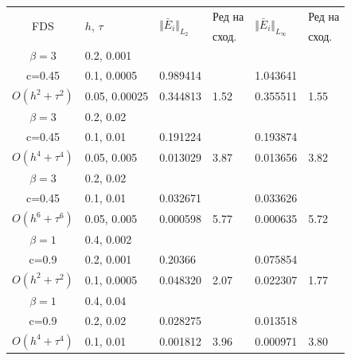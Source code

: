 \documentclass{article}
\begin{document}
\begin{table}[ht]
\centering
\small
		\begin{tabular}{||c|l|ll|ll||}
			\hline
			\hline


      \multirow{2  }{*}{FDS}        & \multirow{2  }{*}{$h$, $\tau$}  &	\multirow{2  }{*}{  $\Vert \bar E_i \Vert_{L_2} $ } 	&Ред на & \multirow{2  }{*}{  $\Vert \bar E_i \Vert_{L_\infty}$ }	&Ред на   \\
	                                        &                                                &    										&  сход. & 										& сход. \\
   			\hline 
					\hline 
  $\beta=3$                &0.2, 0.001          &              &              &                     &      \\
   c=0.45                     &0.1, 0.0005          &0.989414 &            &1.043641    &       \\
     $O(h^2 + \tau^ 2)$ &0.05, 0.00025   & 0.344813 & 1.52    &0.355511    &  1.55      \\
			\hline 
  $\beta=3$               &0.2, 0.02       &              &            &                     &      \\
   c=0.45                    &0.1, 0.01      &0.191224 &            &0.193874    &       \\
     $O(h^4+ \tau^4)$ &0.05, 0.005&0.013029 & 3.87   &0.013656     &3.82       \\
			\hline 
  $\beta=3$               &0.2, 0.02       &                &            &                     &      \\
     c=0.45                 &0.1, 0.01        &0.032671 &            &  0.033626    &       \\
     $O(h^6+ \tau^6)$ &0.05, 0.005 &0.000598 &5.77     & 0.000635    & 5.72       \\
	   \hline
			\hline 
       $\beta=1$       &0.4, 0.002        &             &            &           &   \\
                  c=0.9    &0.2, 0.001       &  0.20366   &            &0.075854 &   \\
  $O(h^2+ \tau^2)$ &0.1, 0.0005   &0.048320   &2.07  &0.022307  & 1.77 \\
			\hline
      $\beta=1$               &0.4, 0.04    &            &               &             &    \\
       c=0.9                     &0.2, 0.02     & 0.028275   &        &  0.013518   &   \\
       $O(h^4+ \tau^4)$ &0.1, 0.01   &0.001812 & 3.96  & 0.000971  & 3.80  \\

\end{tabular}
\end{table}
\end{document}
